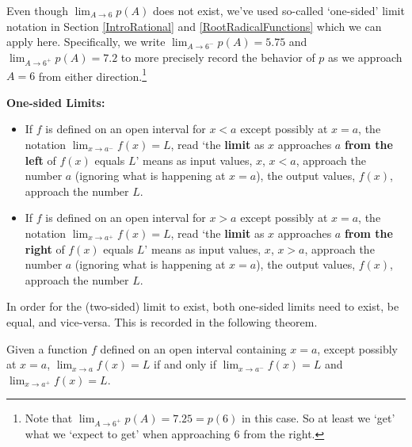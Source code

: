 \documentclass{ximera}
\begin{document}
Even though $\lim_{A \rightarrow 6} p(A)$ does not exist, we've used so-called `one-sided' limit notation in Section \ref{IntroRational} and \ref{RootRadicalFunctions} which we can apply here.  Specifically, we write  $\lim_{A \rightarrow 6^{-}} p(A) = 5.75$ and  $\lim_{A \rightarrow 6^{+}} p(A) = 7.2$ to more precisely record the behavior of $p$ as we approach $ A = 6$ from either direction.\footnote{Note that $\lim_{A \rightarrow 6^{+}} p(A) = 7.25 = p(6)$ in this case.  So at least we `get' what we `expect to get' when approaching $6$ from the right.}




\begin{definition} \label{onesidedimitdefn} \textbf{One-sided Limits:}  

\begin{itemize}

\item If $f$ is defined on an open interval for $x<a$ except possibly at $x=a$, the notation  $\lim_{x \rightarrow a^{-}} f(x) = L$, read `the \textbf{limit} as $x$ approaches $a$ \textbf{from the left} of $f(x)$ equals $L$' means as input values, $x$, $x < a$, approach the number $a$ (ignoring what is happening at $x=a$), the output values, $f(x)$, approach the number $L$. 

\item If $f$ is defined on an open interval for $x>a$ except possibly at $x=a$, the notation  $\lim_{x \rightarrow a^{+}} f(x) = L$, read `the \textbf{limit} as $x$ approaches $a$ \textbf{from the right} of $f(x)$ equals $L$' means as input values, $x$, $x > a$, approach the number $a$ (ignoring what is happening at $x=a$), the output values, $f(x)$, approach the number $L$. 


\end{itemize}

\end{definition}





In order for the (two-sided) limit to exist, both one-sided limits need to exist, be equal, and vice-versa.  This is recorded in the following theorem.




\begin{theorem}  \label{onesidedlimit}  Given a function $f$ defined on an open interval containing $x=a$, except possibly at $x=a$,  $\lim_{x \rightarrow a} f(x) = L$ if and only if $\lim_{x \rightarrow a^{-}} f(x) = L$ and $\lim_{x \rightarrow a^{+}} f(x) = L$.


\end{theorem}
\end{document}
